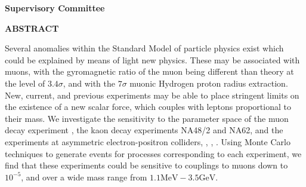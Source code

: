 \newpage
{}

\noindent \textbf{Supervisory Committee}
\tpbreak
\panel

\begin{center}
\textbf{ABSTRACT}
\end{center}

Several anomalies within the Standard Model of particle physics exist which could be explained by means of light new physics.
These may be associated with muons, with the gyromagnetic ratio of the muon being different than theory at the level of $3.4\sigma$, and with the $7\sigma$ muonic Hydrogen proton radius extraction.
New, current, and previous experiments may be able to place stringent limits on the existence of a new scalar force, which couples with leptons proportional to their mass.
We investigate the sensitivity to the parameter space of the muon decay experiment \mueee, the kaon decay experiments NA48/2 and NA62, and the experiments at asymmetric electron-positron colliders, \babar, \belle, \belletwo.
Using Monte Carlo techniques to generate events for processes corresponding to each experiment, we find that these experiments could be sensitive to couplings to muons down to $10^{-5}$, and over a wide mass range from $1.1\textrm{MeV} - 3.5\textrm{GeV}$.
